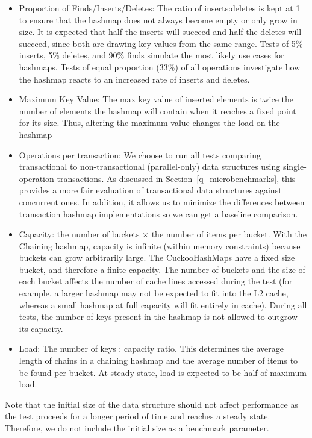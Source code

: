 \begin{itemize}
    \item Proportion of Finds/Inserts/Deletes: The ratio of inserts:deletes is kept at 1 to ensure that the hashmap does not always become empty or only grow in size. It is expected that half the inserts will succeed and half the deletes will succeed, since both are drawing key values from the same range. Tests of 5\% inserts, 5\% deletes, and 90\% finds simulate the most likely use cases for hashmaps\cite{hm1}. Tests of equal proportion (33\%) of all operations investigate how the hashmap reacts to an increased rate of inserts and deletes.
    \item Maximum Key Value: The max key value of inserted elements is twice the number of elements the hashmap will contain when it reaches a fixed point for its size. Thus, altering the maximum value changes the load on the hashmap
    \item Operations per transaction: We choose to run all tests comparing transactional to non-transactional (parallel-only) data structures using single-operation transactions. As discussed in Section~\ref{q_microbenchmarks}, this provides a more fair evaluation of transactional data structures against concurrent ones. In addition, it allows us to minimize the differences between transaction hashmap implementations so we can get a baseline comparison.
    \item Capacity: the number of buckets $\times$ the number of items per bucket. With the Chaining hashmap, capacity is infinite (within memory constraints) because buckets can grow arbitrarily large. The CuckooHashMaps have a fixed size bucket, and therefore a finite capacity. 
        The number of buckets and the size of each bucket affects the number of cache lines accessed during the test (for example, a larger hashmap may not be expected to fit into the L2 cache, whereas a small hashmap at full capacity will fit entirely in cache). During all tests, the number of keys present in the hashmap is not allowed to outgrow its capacity.
    \item Load: The number of keys : capacity ratio. This determines the average length of chains in a chaining hashmap and the average number of items to be found per bucket. At steady state, load is expected to be half of maximum load. 
\end{itemize}
Note that the initial size of the data structure should not affect performance as the test proceeds for a longer period of time and reaches a steady state. Therefore, we do not include the initial size as a benchmark parameter.

